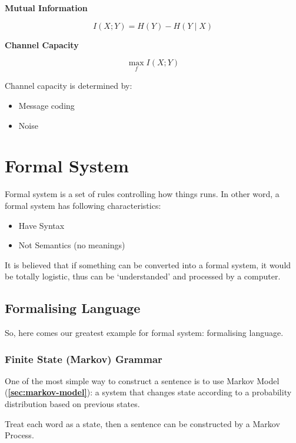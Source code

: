 \documentclass[a4paper, openany]{book}
\begin{document}
\textbf{Mutual Information}

\[\mathit{I} ( \mathit{X}; \mathit{Y} ) = \mathit{H} ( \mathit{Y} ) - \mathit{H} ( \mathit{Y} \mid \mathit{X} )\]

\textbf{Channel Capacity}

\[\max_{\mathit{f}} \mathit{I} ( \mathit{X}; \mathit{Y} )\]

Channel capacity is determined by:

\begin{itemize}
  \item Message coding
  \item Noise
\end{itemize}

\section{Formal System}

Formal system is a set of rules controlling how things runs. In other word, a formal system has following characteristics:

\begin{itemize}
  \item Have Syntax
  \item Not Semantics (no meanings)
\end{itemize}

It is believed that if something can be converted into a formal system, it would be totally logistic, thus can be `understanded' and processed by a computer.

\subsection{Formalising Language}

So, here comes our greatest example for formal system: formalising language.

\subsubsection{Finite State (Markov) Grammar}
\label{sec:markov-grammar}

One of the most simple way to construct a sentence is to use Markov Model (\textbf{\cref{sec:markov-model}}): a system that changes state according to a probability distribution based on previous states.

Treat each word as a state, then a sentence can be constructed by a Markov Process.
\end{document}
